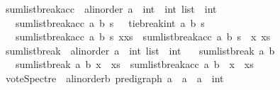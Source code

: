 \begin{isabellebody}
\isanewline
{}\isamarkupfalse%
\ sumlist{\isacharunderscore}{\kern0pt}break{\isacharunderscore}{\kern0pt}acc\ {\isacharcolon}{\kern0pt}{\isacharcolon}{\kern0pt}\ {\isachardoublequoteopen}{\isacharprime}{\kern0pt}a{\isacharcolon}{\kern0pt}{\isacharcolon}{\kern0pt}linorder\ {\isasymRightarrow}{\isacharprime}{\kern0pt}a\ {\isasymRightarrow}\ int\ {\isasymRightarrow}\ int\ list\ {\isasymRightarrow}\ int{\isachardoublequoteclose}\isanewline
\ \ \ {\isachardoublequoteopen}sumlist{\isacharunderscore}{\kern0pt}break{\isacharunderscore}{\kern0pt}acc\ a\ b\ s\ {\isacharbrackleft}{\kern0pt}{\isacharbrackright}{\kern0pt}\ {\isacharequal}{\kern0pt}\ tie{\isacharunderscore}{\kern0pt}break{\isacharunderscore}{\kern0pt}int\ a\ b\ s{\isachardoublequoteclose}\isanewline
\ \ {\isacharbar}{\kern0pt}\ {\isachardoublequoteopen}sumlist{\isacharunderscore}{\kern0pt}break{\isacharunderscore}{\kern0pt}acc\ a\ b\ s\ {\isacharparenleft}{\kern0pt}x{\isacharhash}{\kern0pt}xs{\isacharparenright}{\kern0pt}\ {\isacharequal}{\kern0pt}\ sumlist{\isacharunderscore}{\kern0pt}break{\isacharunderscore}{\kern0pt}acc\ a\ b\ {\isacharparenleft}{\kern0pt}s\ {\isacharplus}{\kern0pt}\ x{\isacharparenright}{\kern0pt}\ xs{\isachardoublequoteclose}\isanewline
\isanewline
{}\isamarkupfalse%
\ sumlist{\isacharunderscore}{\kern0pt}break\ {\isacharcolon}{\kern0pt}{\isacharcolon}{\kern0pt}\ {\isachardoublequoteopen}{\isacharprime}{\kern0pt}a{\isacharcolon}{\kern0pt}{\isacharcolon}{\kern0pt}linorder\ {\isasymRightarrow}{\isacharprime}{\kern0pt}a\ {\isasymRightarrow}\ int\ list\ {\isasymRightarrow}\ int{\isachardoublequoteclose}\isanewline
\ \ \ {\isachardoublequoteopen}sumlist{\isacharunderscore}{\kern0pt}break\ a\ b\ {\isacharbrackleft}{\kern0pt}{\isacharbrackright}{\kern0pt}\ {\isacharequal}{\kern0pt}\ {}{\isachardoublequoteclose}\isanewline
\ \ {\isacharbar}{\kern0pt}\ {\isachardoublequoteopen}sumlist{\isacharunderscore}{\kern0pt}break\ a\ b\ {\isacharparenleft}{\kern0pt}x\ {\isacharhash}{\kern0pt}\ xs{\isacharparenright}{\kern0pt}\ {\isacharequal}{\kern0pt}\ sumlist{\isacharunderscore}{\kern0pt}break{\isacharunderscore}{\kern0pt}acc\ a\ b\ {}\ {\isacharparenleft}{\kern0pt}x\ {\isacharhash}{\kern0pt}\ xs{\isacharparenright}{\kern0pt}{\isachardoublequoteclose}\isanewline
\isanewline
{}\isamarkupfalse%
\ vote{\isacharunderscore}{\kern0pt}Spectre\ {\isacharcolon}{\kern0pt}{\isacharcolon}{\kern0pt}\ {\isachardoublequoteopen}{\isacharparenleft}{\kern0pt}{\isacharprime}{\kern0pt}a{\isacharcolon}{\kern0pt}{\isacharcolon}{\kern0pt}linorder{\isacharcomma}{\kern0pt}{\isacharprime}{\kern0pt}b{\isacharparenright}{\kern0pt}\ pre{\isacharunderscore}{\kern0pt}digraph\ {\isasymRightarrow}{\isacharprime}{\kern0pt}a\ {\isasymRightarrow}\ {\isacharprime}{\kern0pt}a\ {\isasymRightarrow}\ {\isacharprime}{\kern0pt}a\ {\isasymRightarrow}\ int{\isachardoublequoteclose}\ \isanewline

\end{isabellebody}
